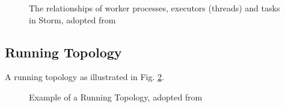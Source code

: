 \documentclass[9pt,twocolumn,twoside]{../../styles/osajnl}
\begin{document}
\begin{figure}[htbp]
	\centering
	\caption{The relationships of worker processes, executors
          (threads) and tasks in Storm, adopted from
          \cite{www-noll2012-parallelismofstormtopology} }
	\label{fig:Storm_worker-processes_executors_tasks}
\end{figure}


\subsection{Running Topology}
A running topology as illustrated in
Fig. \ref{fig:Storm_example_of_a_running_topology}.

\begin{figure}[htbp]
	\centering
	\caption{Example of a Running Topology, adopted from
	\cite{www-noll2012-parallelismofstormtopology} }
	\label{fig:Storm_example_of_a_running_topology}
\end{figure}
\end{document}
